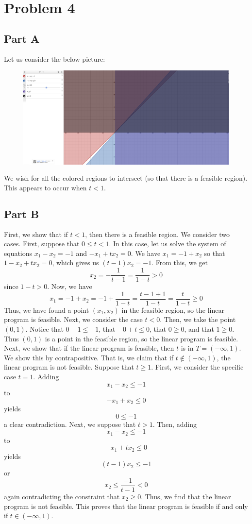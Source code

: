 \documentclass[12pt]{article}
\begin{document}
\section*{Problem 4}
\subsection*{Part A}
Let us consider the below picture:
\begin{figure}[H]
\centering
\includegraphics[width=\textwidth]{desmos1}
\end{figure} We wish for all the colored regions to intersect (so that there is a feasible region). This appears to occur when $t < 1$.
\newpage
\subsection*{Part B}
First, we show that if $t < 1$, then there is a feasible region. We consider two cases. First, suppose that $0 \leq t < 1$. In this case, let us solve the system of equations $x_1 - x_2 = -1$ and $-x_1 + tx_2 = 0$. We have $x_1 = -1 + x_2$ so that $1 - x_2 + tx_2 = 0$, which gives us $(t-1)x_2 = -1$. From this, we get 
\[
x_2 = -\frac{1}{t-1} = \frac{1}{1-t} > 0
\] since $1-t > 0$. Now, we have
\[
x_1 = -1 + x_2 = -1 + \frac{1}{1-t} = \frac{t- 1 + 1}{1-t} = \frac{t}{1-t} \geq 0
\] Thus, we have found a point $(x_1,x_2)$ in the feasible region, so the linear program is feasible. Next, we consider the case $t < 0$. Then, we take the point $(0,1)$. Notice that $0-1\leq -1$, that $-0+t \leq 0$, that $0 \geq 0$, and that $1 \geq 0$. Thus $(0,1)$ is a point in the feasible region, so the linear program is feasible.  Next, we show that if the linear program is feasible, then $t$ is in $T = (-\infty,1)$. We show this by contrapositive. That is, we claim that if $t \not \in (-\infty,1)$, the linear program is not feasible. Suppose that $t \geq 1$. First, we consider the specific case $t = 1$. Adding 
\[
x_1-x_2 \leq -1
\] to
\[
-x_1+x_2 \leq 0
\] yields
\[
0 \leq -1
\] a clear contradiction. Next, we suppose that $t > 1$. Then, adding
\[
x_1 - x_2 \leq -1
\] to
\[
-x_1 + tx_2 \leq 0
\] yields
\[
(t-1)x_2 \leq -1
\] or
\[
x_2 \leq \frac{-1}{t-1} < 0
\] again contradicting the constraint that $x_2 \geq 0$. Thus, we find that the linear program is not feasible. This proves that the linear program is feasible if and only if $t \in (-\infty,1)$.
\newpage
\end{document}
